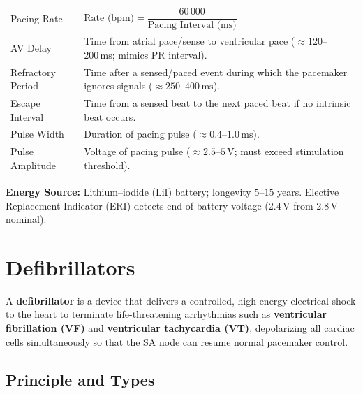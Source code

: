 \documentclass[12pt,a4paper]{article}
\renewcommand{\arraystretch}{1.45}
\begin{document}
\begin{tcolorbox}[formulabox, title={\textbf{Pacemaker Timing Intervals}}]
\renewcommand{\arraystretch}{1.3}
\begin{tabularx}{\linewidth}{B{3.8cm} X}
Pacing Rate & $\text{Rate (bpm)} = \dfrac{60\,000}{\text{Pacing Interval (ms)}}$ \\[8pt]
AV Delay & Time from atrial pace/sense to ventricular pace ($\approx 120$--$200\,\text{ms}$; mimics PR interval). \\[4pt]
Refractory Period & Time after a sensed/paced event during which the pacemaker ignores signals ($\approx 250$--$400\,\text{ms}$). \\[4pt]
Escape Interval & Time from a sensed beat to the next paced beat if no intrinsic beat occurs. \\[4pt]
Pulse Width & Duration of pacing pulse ($\approx 0.4$--$1.0\,\text{ms}$). \\[4pt]
Pulse Amplitude & Voltage of pacing pulse ($\approx 2.5$--$5\,\text{V}$; must exceed stimulation threshold).
\end{tabularx}
\end{tcolorbox}

\textbf{Energy Source:} Lithium--iodide (LiI) battery; longevity $5$--$15$ years. Elective Replacement Indicator (ERI) detects end-of-battery voltage ($2.4\,\text{V}$ from $2.8\,\text{V}$ nominal).

\section{Defibrillators}

\begin{tcolorbox}[defbox, title={\textbf{Definition: Defibrillator}}]
A \textbf{defibrillator} is a device that delivers a controlled, high-energy electrical shock to the heart to terminate life-threatening arrhythmias such as \textbf{ventricular fibrillation (VF)} and \textbf{ventricular tachycardia (VT)}, depolarizing all cardiac cells simultaneously so that the SA node can resume normal pacemaker control.
\end{tcolorbox}

\subsection{Principle and Types}
\end{document}
